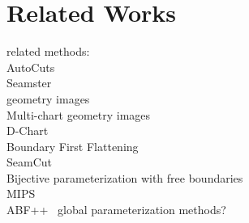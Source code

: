 \section{Related Works}

related methods:\\
AutoCuts~\cite{Poranne2017Autocuts}\\
Seamster~\cite{Sheffer2002Seamster}\\
geometry images~\cite{Gu2002Geometry}\\
Multi-chart geometry images~\cite{Snyder2003Multi}\\
D-Chart~\cite{Julius2005D}\\
Boundary First Flattening~\cite{Sawhney:2017}\\
SeamCut~\cite{Lucquin:2017}\\
Bijective parameterization with free boundaries~\cite{Smith2015Bijective}\\
MIPS~\cite{Hormann2000MIPS}\\
ABF++~\cite{Sheffer2005ABFPP}
global parameterization methods?
